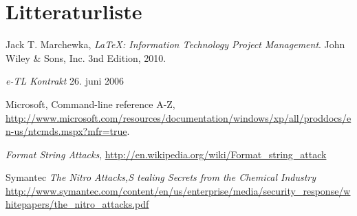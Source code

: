\documentclass[10pt,a4paper,danish]{article}
\begin{document}
\section{Litteraturliste}

\begin{thebibliography}{9}
 Jack T. Marchewka, \textit{\LaTeX: Information Technology
    Project Management}.  John Wiley \& Sons, Inc.  3nd Edition, 2010.

 \textit{e-TL Kontrakt} 26. juni 2006

 Microsoft, Command-line reference A-Z,
  \url{http://www.microsoft.com/resources/documentation/windows/xp/all/proddocs/en-us/ntcmds.mspx?mfr=true}.

 \textit{Format String Attacks},
  \url{http://en.wikipedia.org/wiki/Format_string_attack}

 Symantec \textit{The Nitro Attacks,S
tealing Secrets from the Chemical Industry} \url{http://www.symantec.com/content/en/us/enterprise/media/security_response/whitepapers/the_nitro_attacks.pdf}

\end{thebibliography}
\end{document}
